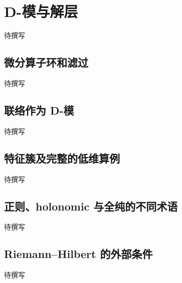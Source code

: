 
% 
% 

\section{D-模与解层}
\label{g5:sec:3603}

待撰写

\subsection{微分算子环和滤过}
\label{g5:subsec:3603:01}
待撰写

\subsection{联络作为 D-模}
\label{g5:subsec:3603:02}
待撰写

\subsection{特征簇及完整的低维算例}
\label{g5:subsec:3603:03}
待撰写

\subsection{正则、holonomic 与全纯的不同术语}
\label{g5:subsec:3603:04}
待撰写

\subsection{Riemann–Hilbert 的外部条件}
\label{g5:subsec:3603:05}
待撰写
